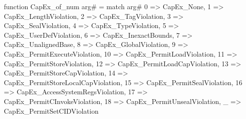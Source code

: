 function CapEx_of_num arg# = match arg# {
  0 => CapEx_None,
  1 => CapEx_LengthViolation,
  2 => CapEx_TagViolation,
  3 => CapEx_SealViolation,
  4 => CapEx_TypeViolation,
  5 => CapEx_UserDefViolation,
  6 => CapEx_InexactBounds,
  7 => CapEx_UnalignedBase,
  8 => CapEx_GlobalViolation,
  9 => CapEx_PermitExecuteViolation,
  10 => CapEx_PermitLoadViolation,
  11 => CapEx_PermitStoreViolation,
  12 => CapEx_PermitLoadCapViolation,
  13 => CapEx_PermitStoreCapViolation,
  14 => CapEx_PermitStoreLocalCapViolation,
  15 => CapEx_PermitSealViolation,
  16 => CapEx_AccessSystemRegsViolation,
  17 => CapEx_PermitCInvokeViolation,
  18 => CapEx_PermitUnsealViolation,
  _ => CapEx_PermitSetCIDViolation
}
